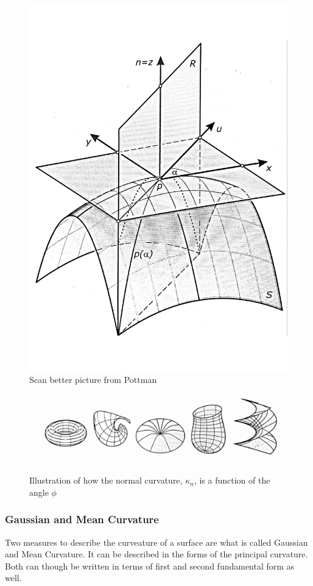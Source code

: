 \begin{figure}[H]
\centering
\includegraphics[width = 0.6\linewidth ]{figure/Theory/principalCurvature2.pdf}
\caption{Scan better picture from Pottman\cite{ref:ArchGeometry} }
\end{figure}



\begin{figure}[H]
\centering
\includegraphics[width = 0.9\linewidth ]{figure/Theory/principalCurvature.pdf}
\caption{Illustration of how the normal curvature, $\kappa_n$, is a function of the angle $\phi$ \cite{ref:ArchGeometry}}
\end{figure}


\subsubsection{Gaussian and Mean Curvature}

Two measures to describe the curveature of a surface are what is called Gaussian and Mean Curvature. It can be described in the forms of the principal curvature. Both can though be written in terms of first and second fundamental form as well.  

